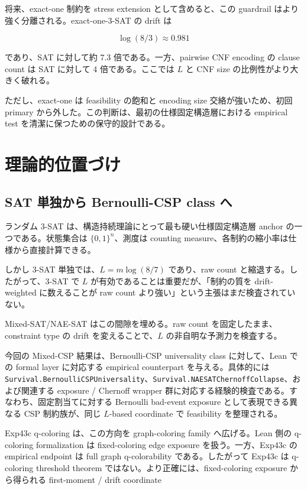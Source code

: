 \documentclass[12pt,a4paper]{article}
\begin{document}
将来、exact-one 制約を stress extension として含めると、この guardrail はより強く分離される。exact-one-3-SAT の drift は

\[
\log(8/3)\approx 0.981
\]

であり、SAT に対して約 7.3 倍である。一方、pairwise CNF encoding の clause count は SAT に対して 4 倍である。ここでは \(L\) と CNF size の比例性がより大きく破れる。

ただし、exact-one は feasibility の飽和と encoding size 交絡が強いため、初回 primary から外した。この判断は、最初の仕様固定構造層における empirical test を清潔に保つための保守的設計である。

\section{理論的位置づけ}\label{ux7406ux8ad6ux7684ux4f4dux7f6eux3065ux3051}

\subsection{SAT 単独から Bernoulli-CSP class へ}\label{sat-ux5358ux72ecux304bux3089-bernoulli-csp-class-ux3078}

ランダム 3-SAT は、構造持続理論にとって最も硬い仕様固定構造層 anchor の一つである。状態集合は \(\{0,1\}^n\)、測度は counting measure、各制約の縮小率は仕様から直接計算できる。

しかし 3-SAT 単独では、\(L=m\log(8/7)\) であり、raw count と縮退する。したがって、3-SAT で \(L\) が有効であることは重要だが、「制約の質を drift-weighted に数えることが raw count より強い」という主張はまだ検査されていない。

Mixed-SAT/NAE-SAT はこの間隙を埋める。raw count を固定したまま、constraint type の drift を変えることで、\(L\) の非自明な予測力を検査する。

今回の Mixed-CSP 結果は、Bernoulli-CSP universality class に対して、Lean での formal layer に対応する empirical counterpart を与える。具体的には \texttt{Survival.BernoulliCSPUniversality}、\texttt{Survival.NAESATChernoffCollapse}、および関連する exposure / Chernoff wrapper 群に対応する経験的検査である。すなわち、固定割当てに対する Bernoulli bad-event exposure として表現できる異なる CSP 制約族が、同じ \(L\)-based coordinate で feasibility を整理される。

Exp43c q-coloring は、この方向を graph-coloring family へ広げる。Lean 側の q-coloring formalization は fixed-coloring edge exposure を扱う。一方、Exp43c の empirical endpoint は full graph q-colorability である。したがって Exp43c は q-coloring threshold theorem ではない。より正確には、fixed-coloring exposure から得られる first-moment / drift coordinate
\end{document}
